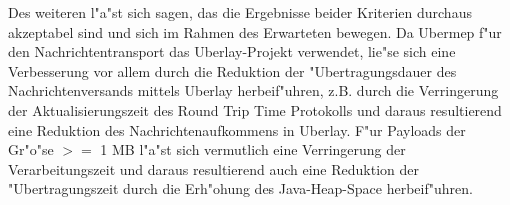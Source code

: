 
Des weiteren l"a"st sich sagen, das die Ergebnisse beider Kriterien durchaus akzeptabel sind und sich im Rahmen des Erwarteten bewegen. Da Ubermep f"ur den Nachrichtentransport das Uberlay-Projekt verwendet, lie"se sich eine Verbesserung vor allem durch die Reduktion der "Ubertragungsdauer des Nachrichtenversands mittels Uberlay herbeif"uhren, z.B. durch die Verringerung der Aktualisierungszeit des Round Trip Time Protokolls und daraus resultierend eine Reduktion des Nachrichtenaufkommens in Uberlay. F"ur Payloads der Gr"o"se $>=$ 1 MB l"a"st sich vermutlich eine Verringerung der Verarbeitungszeit und daraus resultierend auch eine Reduktion der "Ubertragungszeit durch die Erh"ohung des Java-Heap-Space herbeif"uhren.





